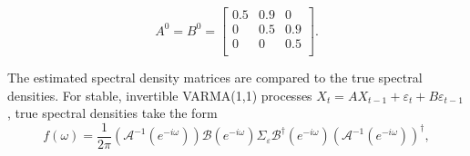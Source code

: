 \begin{equation}
A^0 = B^0 = \left[ \begin{array}{ccc} 
0.5 & 0.9 & 0  \\ 
0 & 0.5 & 0.9  \\
0 & 0 & 0.5  \\
\end{array}\right].
\end{equation} 





The estimated spectral density matrices are compared to the true spectral densities. For stable, invertible VARMA(1,1) processes $X_t = AX_{t-1} + 
  \varepsilon_t 
  + B\varepsilon_{t-1}
$, true spectral densities take the form 
\begin{equation*}
f(\omega) = \frac{1}{2\pi} (\mathcal{A}^{-1}(e^{-i\omega}))\mathcal{B}(e^{-i\omega})\Sigma_{\varepsilon}\mathcal{B}^{\dag}(e^{-i\omega})(\mathcal{A}^{-1}(e^{-i\omega}))^{\dag},
\end{equation*}

